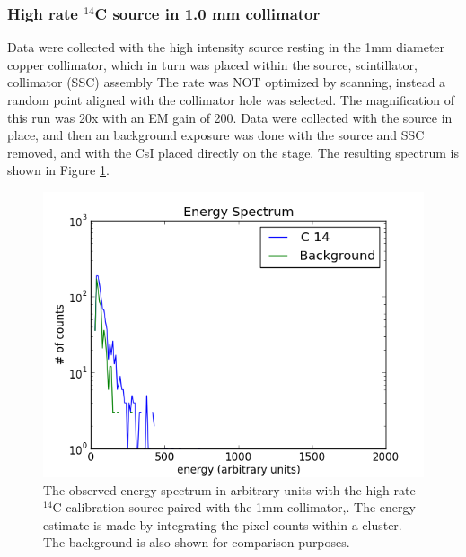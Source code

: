 \documentclass[11pt]{article}
\newcommand{\nuc}[2]{\ensuremath{^{#1}}#2}
\begin{document}
\subsubsection{High rate \nuc{14}{C} source in 1.0 mm collimator} 
Data were collected with the high intensity source resting in the 1mm diameter copper collimator, which in turn was placed within the source, scintillator, collimator (SSC) assembly
The rate was NOT optimized by scanning,
instead a random point aligned with the collimator hole was selected. The magnification of this run was 20x with an EM gain of 200. 
Data were collected with the source in place, and then an background exposure was done with the source and SSC removed, and with the CsI placed directly on the stage.
The resulting spectrum is shown in Figure \ref{pic:high_rate_c4_1mm_collimator_spectrum}.
\begin{figure}[h!p] 
  \begin{center}  
    \includegraphics[]{eriks_plots/cluster_smooth_plot_coll_8_13_2013.png}
     	\caption{The observed energy spectrum in arbitrary units with the high rate \nuc{14}{C} calibration source paired with the 1mm collimator,. The energy estimate is made by integrating the pixel counts within a cluster. The background is also shown for comparison purposes.            }
       \label{pic:high_rate_c4_1mm_collimator_spectrum}
   \end{center}    
 \end{figure} 
\end{document}
